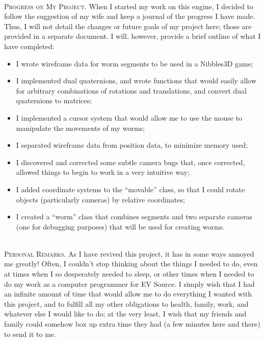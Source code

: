 \documentclass[10pt]{article}
\newcommand{\normaltitleize}[1]{\mbox{}\\ \textsc{#1} \normalsize}
\begin{document}
\normaltitleize{Progress on My Project.}  When I started my work on this engine, I decided to follow the suggestion of my wife and keep a journal of the progress I have made.  Thus, I will not detail the changes or future goals of my project here; those are provided in a separate document.  I will, however, provide a brief outline of what I have completed:
\begin{itemize}
   \item I wrote wireframe data for worm segments to be used in a Nibbles3D game;

   \item I implemented dual quaternions, and wrote functions that would easily allow for arbitrary combinations of rotations and translations, and convert dual quaternions to matrices;

   \item I implemented a cursor system that would allow me to use the mouse to manipulate the movements of my worms;

   \item I separated wireframe data from position data, to minimize memory used;

   \item I discovered and corrected some subtle camera bugs that, once corrected, allowed things to begin to work in a very intuitive way;

   \item I added coordinate systems to the ``movable'' class, so that I could rotate objects (particularly cameras) by relative coordinates;

   \item I created a ``worm'' class that combines segments and two separate cameras (one for debugging purposes) that will be used for creating worms.
\end{itemize}

\normaltitleize{Personal Remarks.}  As I have revived this project, it has in some ways annoyed me greatly!  Often, I couldn't stop thinking about the things I needed to do, even at times when I so desperately needed to sleep, or other times when I needed to do my work as a computer programmer for EV Source.  I simply wish that I had an infinite amount of time that would allow me to do everything I wanted with this project, and to fulfill all my other obligations to health, family, work, and whatever else I would like to do; at the very least, I wish that my friends and family could somehow box up extra time they had (a few minutes here and there) to send it to me.
\end{document}
